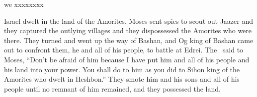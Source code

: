 \begin{inparaenum}
  \pb we xxxx\pa xxxx%
  
   Israel dwelt in the land of the Amorites.%
   Moses sent spies to scout out Jaazer and they captured the outlying villages and they dispossessed the Amorites who were there.%
   They turned and went up the way of Bashan, and Og king of Bashan came out to confront them, he and all of his people, to battle at Edrei.%
   The \lord\ said to Moses, ``Don't be afraid of him because I have put him and all of his people and his land into your power. You shall do to him as you did to Sihon king of the Amorites who dwelt in Heshbon.''%
   They smote him and his sons and all of his people until no remnant of him remained, and they possessed the land.%
\end{inparaenum}
